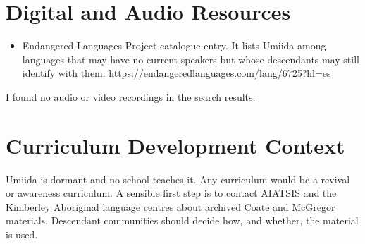 \documentclass[12pt]{article}
\begin{document}
\section{Digital and Audio Resources}
\begin{itemize}
\item Endangered Languages Project catalogue entry. It lists Umiida among languages that may have no current speakers but whose descendants may still identify with them. \url{https://endangeredlanguages.com/lang/6725?hl=es}
\end{itemize}
I found no audio or video recordings in the search results.

\section{Curriculum Development Context}
Umiida is dormant and no school teaches it. Any curriculum would be a revival or awareness curriculum. A sensible first step is to contact AIATSIS and the Kimberley Aboriginal language centres about archived Coate and McGregor materials. Descendant communities should decide how, and whether, the material is used.
\end{document}
